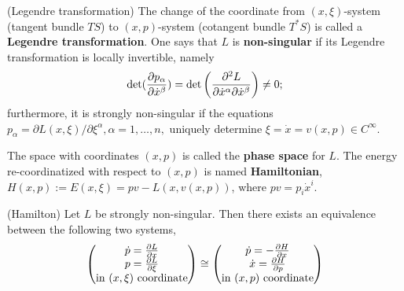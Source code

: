 \begin{definition}
	(Legendre transformation) The change of the coordinate from $(x, \xi)$-system (tangent bundle $TS$) to $(x, p)$-system (cotangent bundle $T^* S$) is called a \textbf{Legendre transformation}. One says that $L$ is \textbf{non-singular} if its Legendre transformation is locally invertible, namely
	\[\det(\frac{ \partial p_{\alpha}}{ \partial \dot{x}^{\beta} }) = \det\left( \frac{\partial^2 L}{\partial \dot{x}^{\alpha}  \partial \dot{x}^{\beta}} \right) \ne 0;\]
	furthermore, it is strongly non-singular if the equations $p_{\alpha} = \partial L(x, \xi)/\partial \xi^{\alpha}, \alpha = 1, \dots, n,$ uniquely determine $\xi = \dot{x} = v(x, p) \in C^{\infty}$.
\end{definition}

\begin{definition}
	The space with coordinates $(x, p)$ is called the \textbf{phase space} for $L$. The energy re-coordinatized with respect to $(x, p)$ is named \textbf{Hamiltonian}, $H(x, p) := E(x, \xi) = pv - L(x, v(x, p))$, where $pv = p_i \dot{x}^i$.
\end{definition}

\begin{theorem}
	(Hamilton) Let $L$ be strongly non-singular. Then there exists an equivalence between the following two systems,
	\begin{eqnarray}
		\begin{pmatrix}
			\dot{p} = \frac{ \partial L}{ \partial x }\\
			p = \frac{ \partial L}{ \partial \xi }\\
			\text{in }(x, \xi) \text{ coordinate}
		\end{pmatrix}
		\cong
		\begin{pmatrix}
			\dot{p} = -\frac{ \partial H}{ \partial x }\\
			\dot{x} = \frac{ \partial H}{ \partial p }\\
			\text{in }(x, p) \text{ coordinate}
		\end{pmatrix}
	\end{eqnarray}
\end{theorem}

